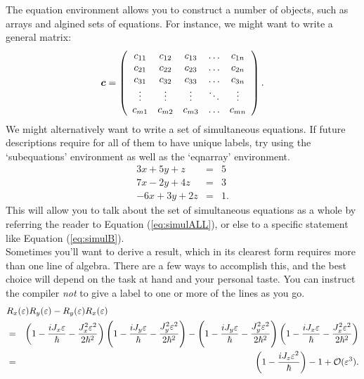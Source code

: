 The equation environment allows you to construct a number of objects, such as arrays and algined sets of equations. For instance, we might want to write a general matrix:
\begin{equation}
\boldsymbol{c} = 
  \left(\begin{array}{c c c c c}
    c_{11} & c_{12} & c_{13} & \ldots & c_{1n} \\
    c_{21} & c_{22} & c_{23} & \ldots & c_{2n} \\
    c_{31} & c_{32} & c_{33} & \ldots & c_{3n} \\
    \vdots & \vdots & \vdots & \ddots & \vdots \\
    c_{m1} & c_{m2} & c_{m3} & \ldots & c_{mn} \\
  \end{array}\right).
\end{equation}
We might alternatively want to write a set of simultaneous equations. If future descriptions require for all of them to have unique labels, try using the `subequations' environment as well as the `eqnarray' environment.
\begin{subequations}\label{eq:simulALL}
\begin{eqnarray}
 3x + 5y +  z &=& 5\\ \label{eq:simulB}
 7x - 2y + 4z &=& 3\\
-6x + 3y + 2z &=& 1.
\end{eqnarray}
\end{subequations}
This will allow you to talk about the set of simultaneous equations as a whole by referring the reader to Equation (\ref{eq:simulALL}), or else to a specific statement like Equation (\ref{eq:simulB}).\\

Sometimes you'll want to derive a result, which in its clearest form requires more than one line of algebra. There are a few ways to accomplish this, and the best choice will depend on the task at hand and your personal taste. You can instruct the compiler \textit{not} to give a label to one or more of the lines as you go.
\begin{eqnarray}\notag
\lefteqn{R_{x} (\varepsilon) R_{y} (\varepsilon) - R_{y} (\varepsilon) R_{x} (\varepsilon)} \\ \notag
& = &  \left( 1 - \frac{i J_{x} \varepsilon}{\hbar} - \frac{J_{x}^{2} \varepsilon^{2}}{2 \hbar^{2}} \right) 
 \left( 1 - \frac{i J_{y} \varepsilon}{\hbar} - \frac{J_{y}^{2} \varepsilon^{2}}{2 \hbar^{2}} \right) - 
 \left( 1 - \frac{i J_{y} \varepsilon}{\hbar} - \frac{J_{y}^{2} \varepsilon^{2}}{2 \hbar^{2}} \right)
 \left( 1 - \frac{i J_{x} \varepsilon}{\hbar} - \frac{J_{x}^{2} \varepsilon^{2}}{2 \hbar^{2}} \right) \\
& = &  \left( 1 - \frac{i J_{z} \varepsilon^{2}}{\hbar} \right) - 1 + \mathcal{O} (\varepsilon^{3}). 
\end{eqnarray}

